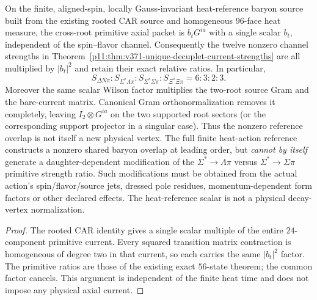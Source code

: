 \documentclass[12pt,a4paper]{article}
\begin{document}
\begin{corollary}
\label{p11:cor:v378-heat-root-common-factor-no-go}
On the finite, aligned-spin, locally Gauss-invariant heat-reference
baryon source built from the existing rooted CAR source and
homogeneous $96$-face heat measure, the cross-root primitive axial
packet is $b_tG^{ia}$ with a single scalar $b_t$, independent of
the spin--flavor channel. Consequently the twelve nonzero channel
strengths in
Theorem~\ref{p11:thm:v371-unique-decuplet-current-strengths}
are all multiplied by $|b_t|^2$ and retain their exact relative
ratios. In particular,
\[
 \boxed{S_{\Delta N\pi}:S_{\Sigma^*\Lambda\pi}:
 S_{\Sigma^*\Sigma\pi}:S_{\Xi^*\Xi\pi}=6:3:2:3.}
\]
Moreover the same scalar Wilson factor multiplies the two-root
source Gram and the bare-current matrix. Canonical Gram
orthonormalization removes it completely, leaving
$I_2\otimes G^{ia}$ on the two supported root sectors (or the
corresponding support projector in a singular case). Thus the
nonzero reference overlap is not itself a new physical vertex.
The full finite heat-action reference constructs a nonzero shared
baryon overlap at leading order, but \emph{cannot by itself}
generate a daughter-dependent modification of the
$\Sigma^*\to\Lambda\pi$ versus $\Sigma^*\to\Sigma\pi$
primitive strength ratio. Such modifications must be obtained from
the actual action's spin/flavor/source jets, dressed pole residues,
momentum-dependent form factors or other declared effects. The
heat-reference scalar is not a physical decay-vertex normalization.
\end{corollary}
\begin{proof}
The rooted CAR identity gives a single scalar multiple of the
entire $24$-component primitive current. Every squared transition
matrix contraction is homogeneous of degree two in that current,
so each carries the same $|b_t|^2$ factor. The primitive ratios
are those of the existing exact $56$-state theorem; the common
factor cancels. This argument is independent of the finite heat
time and does not impose any physical axial current.
\end{proof}
\end{document}
